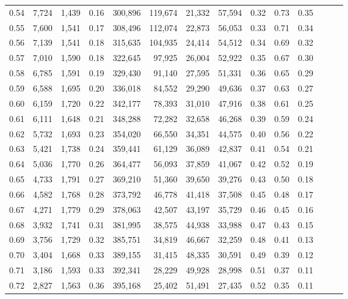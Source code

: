 \begin{tabular}{rrrrrrrrrrrrrr}
0.54 &  7,724 &  1,439 &  0.16 &  300,896 &  119,674 &  21,332 &  57,594 &  0.32 &  0.73 &      0.35 \\
0.55 &  7,600 &  1,541 &  0.17 &  308,496 &  112,074 &  22,873 &  56,053 &  0.33 &  0.71 &      0.34 \\
0.56 &  7,139 &  1,541 &  0.18 &  315,635 &  104,935 &  24,414 &  54,512 &  0.34 &  0.69 &      0.32 \\
0.57 &  7,010 &  1,590 &  0.18 &  322,645 &   97,925 &  26,004 &  52,922 &  0.35 &  0.67 &      0.30 \\
0.58 &  6,785 &  1,591 &  0.19 &  329,430 &   91,140 &  27,595 &  51,331 &  0.36 &  0.65 &      0.29 \\
0.59 &  6,588 &  1,695 &  0.20 &  336,018 &   84,552 &  29,290 &  49,636 &  0.37 &  0.63 &      0.27 \\
0.60 &  6,159 &  1,720 &  0.22 &  342,177 &   78,393 &  31,010 &  47,916 &  0.38 &  0.61 &      0.25 \\
0.61 &  6,111 &  1,648 &  0.21 &  348,288 &   72,282 &  32,658 &  46,268 &  0.39 &  0.59 &      0.24 \\
0.62 &  5,732 &  1,693 &  0.23 &  354,020 &   66,550 &  34,351 &  44,575 &  0.40 &  0.56 &      0.22 \\
0.63 &  5,421 &  1,738 &  0.24 &  359,441 &   61,129 &  36,089 &  42,837 &  0.41 &  0.54 &      0.21 \\
0.64 &  5,036 &  1,770 &  0.26 &  364,477 &   56,093 &  37,859 &  41,067 &  0.42 &  0.52 &      0.19 \\
0.65 &  4,733 &  1,791 &  0.27 &  369,210 &   51,360 &  39,650 &  39,276 &  0.43 &  0.50 &      0.18 \\
0.66 &  4,582 &  1,768 &  0.28 &  373,792 &   46,778 &  41,418 &  37,508 &  0.45 &  0.48 &      0.17 \\
0.67 &  4,271 &  1,779 &  0.29 &  378,063 &   42,507 &  43,197 &  35,729 &  0.46 &  0.45 &      0.16 \\
0.68 &  3,932 &  1,741 &  0.31 &  381,995 &   38,575 &  44,938 &  33,988 &  0.47 &  0.43 &      0.15 \\
0.69 &  3,756 &  1,729 &  0.32 &  385,751 &   34,819 &  46,667 &  32,259 &  0.48 &  0.41 &      0.13 \\
0.70 &  3,404 &  1,668 &  0.33 &  389,155 &   31,415 &  48,335 &  30,591 &  0.49 &  0.39 &      0.12 \\
0.71 &  3,186 &  1,593 &  0.33 &  392,341 &   28,229 &  49,928 &  28,998 &  0.51 &  0.37 &      0.11 \\
0.72 &  2,827 &  1,563 &  0.36 &  395,168 &   25,402 &  51,491 &  27,435 &  0.52 &  0.35 &      0.11 \\

\end{tabular}
